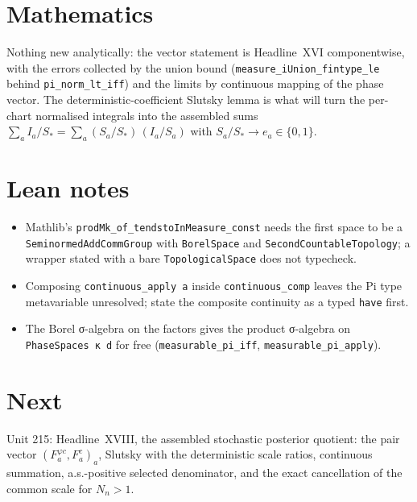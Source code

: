 \documentclass[11pt]{article}
\begin{document}
\section{Mathematics}
Nothing new analytically: the vector statement is Headline~XVI componentwise, with the errors
collected by the union bound (\texttt{measure\_iUnion\_fintype\_le} behind
\texttt{pi\_norm\_lt\_iff}) and the limits by continuous mapping of the phase vector. The
deterministic-coefficient Slutsky lemma is what will turn the per-chart normalised integrals into
the assembled sums $\sum_aI_a/S_*=\sum_a(S_a/S_*)\,(I_a/S_a)$ with $S_a/S_*\to e_a\in\{0,1\}$.

\section{Lean notes}
\begin{itemize}
\item Mathlib's \texttt{prodMk\_of\_tendstoInMeasure\_const} needs the first space to be a
  \texttt{SeminormedAddCommGroup} with \texttt{BorelSpace} and \texttt{SecondCountableTopology};
  a wrapper stated with a bare \texttt{TopologicalSpace} does not typecheck.
\item Composing \texttt{continuous\_apply a} inside \texttt{continuous\_comp} leaves the Pi type
  metavariable unresolved; state the composite continuity as a typed \texttt{have} first.
\item The Borel σ-algebra on the factors gives the product σ-algebra on
  \texttt{PhaseSpaces κ d} for free (\texttt{measurable\_pi\_iff}, \texttt{measurable\_pi\_apply}).
\end{itemize}

\section{Next}
Unit 215: Headline~XVIII, the assembled stochastic posterior quotient: the pair vector
$(F^{\varphi c}_a,F^{c}_a)_a$, Slutsky with the deterministic scale ratios, continuous summation,
a.s.-positive selected denominator, and the exact cancellation of the common scale for $N_n>1$.
\end{document}
